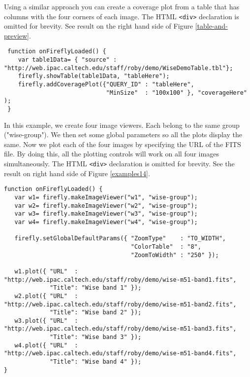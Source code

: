 Using a similar approach you can create a coverage plot from a table that has columns with the four corners of each image. The HTML \scriptsize\texttt{<div>} \normalsize declaration is omitted for brevity. See result on the right hand side of Figure \ref{table-and-preview}.
\normalsize

\scriptsize
\begin{verbatim}
 function onFireflyLoaded() {
    var table1Data= { "source" : "http://web.ipac.caltech.edu/staff/roby/demo/WiseDemoTable.tbl"};
    firefly.showTable(table1Data, "tableHere");
    firefly.addCoveragePlot({"QUERY_ID" : "tableHere",
                             "MinSize"  : "100x100" }, "coverageHere" );
 }
\end{verbatim}
\normalsize

In this example, we create four image viewers. Each belong to the same group ("wise-group").  We then set some global parameters so all the plots display the same. Now we plot each of the four images by specifying the URL of the FITS file. By doing this, all the plotting controls will work on all four images simultaneously. The HTML \scriptsize\texttt{<div>} \normalsize declaration is omitted for brevity. See the result on right hand side of Figure \ref{examples14}.

\scriptsize
\begin{verbatim}
function onFireflyLoaded() {
   var w1= firefly.makeImageViewer("w1", "wise-group");
   var w2= firefly.makeImageViewer("w2", "wise-group");
   var w3= firefly.makeImageViewer("w3", "wise-group");
   var w4= firefly.makeImageViewer("w4", "wise-group");

   firefly.setGlobalDefaultParams({ "ZoomType"    : "TO_WIDTH",
                                    "ColorTable"  : "8",
                                    "ZoomToWidth" : "250" });

   w1.plot({ "URL"  : "http://web.ipac.caltech.edu/staff/roby/demo/wise-m51-band1.fits",
             "Title": "Wise band 1" });
   w2.plot({ "URL"  : "http://web.ipac.caltech.edu/staff/roby/demo/wise-m51-band2.fits",
             "Title": "Wise band 2" });
   w3.plot({ "URL"  : "http://web.ipac.caltech.edu/staff/roby/demo/wise-m51-band3.fits",
             "Title": "Wise band 3" });
   w4.plot({ "URL"  : "http://web.ipac.caltech.edu/staff/roby/demo/wise-m51-band4.fits",
             "Title": "Wise band 4" });
}
\end{verbatim}
\normalsize



